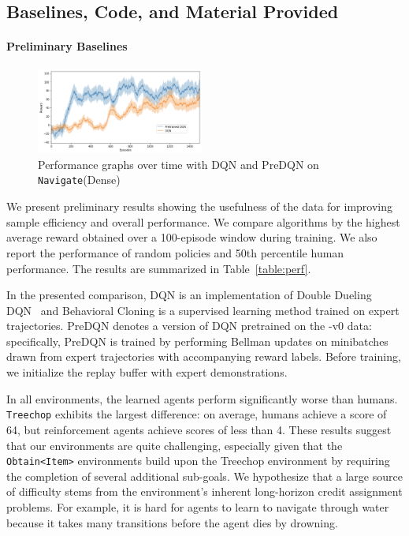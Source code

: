 \subsection{Baselines, Code, and Material Provided} \label{sec:baselines}

\paragraph{Preliminary Baselines}

\begin{figure}
    \begin{center}

        \includegraphics[width=0.49\textwidth]{./assets/dqn.png} 
        \caption{\small Performance graphs over time with DQN and PreDQN on \texttt{Navigate}(Dense)}
        \label{fig:dqn}

    \end{center}
\end{figure}

We present preliminary results showing the usefulness of the data for improving sample efficiency and overall performance. 
We compare algorithms by the highest average reward obtained over a 100-episode window during training.
We also report the performance of random policies and 50th percentile
human performance.
The results are summarized in Table~\ref{table:perf}.

In the presented comparison, DQN is an implementation of Double Dueling DQN~\cite{hasselt2015deep} and Behavioral Cloning is a supervised learning method trained on expert trajectories.
PreDQN denotes a version of DQN pretrained on the \minenet{}-v0 data: specifically, PreDQN is trained by performing Bellman updates on minibatches drawn from expert trajectories with accompanying reward labels. Before training, we initialize the replay buffer with expert demonstrations.

In all environments, the learned agents perform significantly worse than humans.
 \texttt{Treechop} exhibits the largest difference: on average, humans achieve a score of 64, but reinforcement agents achieve scores of less than 4. 
These results suggest that our environments are quite challenging, especially given that the \texttt{Obtain<Item>} environments build upon the Treechop environment by requiring the completion of several additional sub-goals.
We hypothesize that a large source of difficulty stems from the environment’s inherent
long-horizon credit assignment problems.
For example, it is hard for agents to learn to navigate through water because it
takes many transitions before the agent dies by drowning.

